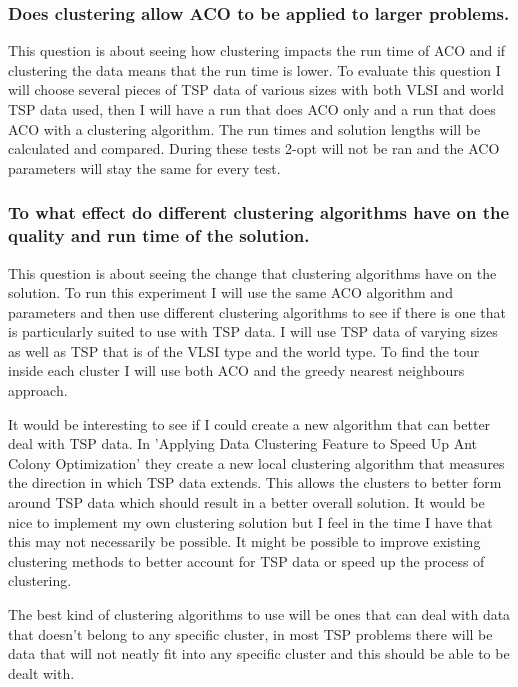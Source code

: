 \subsubsection{Does clustering allow ACO to be applied to larger problems.}

This question is about seeing how clustering impacts the run time of ACO and if clustering the data means that the run time is lower. To evaluate this question I will choose several pieces of TSP data of various sizes with both VLSI and world TSP data used, then I will have a run that does ACO only and a run that does ACO with a clustering algorithm. The run times and solution lengths will be calculated and compared. During these tests 2-opt will not be ran and the ACO parameters will stay the same for every test.

\subsubsection{To what effect do different clustering algorithms have on the quality and run time of the solution.}

This question is about seeing the change that clustering algorithms have on the solution. To run this experiment I will use the same ACO algorithm and parameters and then use different clustering algorithms to see if there is one that is particularly suited to use with TSP data. I will use TSP data of varying sizes as well as TSP that is of the VLSI type and the world type. To find the tour inside each cluster I will use both ACO and the greedy nearest neighbours approach. 

It would be interesting to see if I could create a new algorithm that can better deal with TSP data. In 'Applying Data Clustering Feature to Speed Up Ant Colony Optimization'\cite{pang_chao-yang_ben-qiong_zhang_jie_wei_shan_zheng-chao_2014} they create a new local clustering algorithm that measures the direction in which TSP data extends. This allows the clusters to better form around TSP data which should result in a better overall solution. It would be nice to implement my own clustering solution but I feel in the time I have that this may not necessarily be possible. It might be possible to improve existing clustering methods to better account for TSP data or speed up the process of clustering. 

The best kind of clustering algorithms to use will be ones that can deal with data that doesn't belong to any specific cluster, in most TSP problems there will be data that will not neatly fit into any specific cluster and this should be able to be dealt with. 

